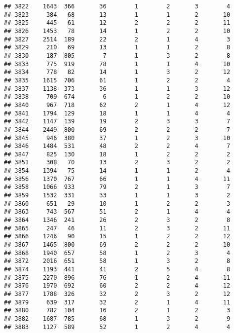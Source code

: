 \documentclass[]{article}
\begin{document}
\begin{verbatim}
## 3822    1643  366       36        1        2       3        4
## 3823     384   68       13        1        1       2       10
## 3825     445   61       12        2        2       2       11
## 3826    1453   78       14        1        2       2       10
## 3827    2514  189       22        2        1       4        3
## 3829     210   69       13        1        1       2        8
## 3830     187  805        7        1        3       2        8
## 3833     775  919       78        1        1       4       10
## 3834     778   82       14        1        3       2       12
## 3835    1615  706       61        1        2       2        4
## 3837    1138  373       36        1        1       3       12
## 3838     709  674        6        1        2       2       10
## 3840     967  718       62        2        1       4       12
## 3841    1794  129       18        1        1       4        4
## 3842    1147  139       19        2        3       3        7
## 3844    2449  800       69        2        2       2        7
## 3845     946  380       37        1        2       3       10
## 3846    1484  531       48        2        2       4        7
## 3847     825  130       18        1        2       2        2
## 3851     308   70       13        2        3       2        2
## 3854    1394   75       14        1        1       2        4
## 3856    1370  767       66        1        1       4       11
## 3858    1066  933       79        2        1       3        7
## 3859    1532  331       33        1        1       3        2
## 3860     651   29       10        1        2       2        3
## 3863     743  567       51        2        1       4        4
## 3864    1346  241       26        2        3       2        8
## 3865     247   46       11        2        3       2       11
## 3866    1246   90       15        1        2       2       12
## 3867    1465  800       69        2        2       2       10
## 3868    1940  657       58        1        2       3        4
## 3872    2016  651       58        1        3       2        8
## 3874    1193  441       41        2        5       4        8
## 3875    2270  896       76        1        2       4       11
## 3876    1970  692       60        2        2       4       12
## 3877    1788  326       32        2        3       2       12
## 3879     639  317       32        2        1       4       11
## 3880     782  104       16        2        1       2        3
## 3882    1687  785       68        1        3       2        9
## 3883    1127  589       52        1        2       4        4

\end{verbatim}
\end{document}
